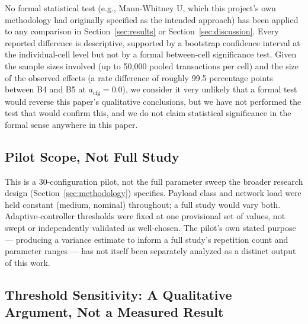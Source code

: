 \documentclass[journal]{IEEEtran}
\newcommand{\acfg}{\ensuremath{a_{\text{cfg}}}}
\begin{document}
No formal statistical test (e.g., Mann-Whitney U, which this project's own methodology had originally specified as the intended approach) has been applied to any comparison in Section~\ref{sec:results} or Section~\ref{sec:discussion}. Every reported difference is descriptive, supported by a bootstrap confidence interval at the individual-cell level but not by a formal between-cell significance test. Given the sample sizes involved (up to 50{,}000 pooled transactions per cell) and the size of the observed effects (a rate difference of roughly 99.5 percentage points between B4 and B5 at $\acfg=0.0$), we consider it very unlikely that a formal test would reverse this paper's qualitative conclusions, but we have not performed the test that would confirm this, and we do not claim statistical significance in the formal sense anywhere in this paper.

\subsection{Pilot Scope, Not Full Study}

This is a 30-configuration pilot, not the full parameter sweep the broader research design (Section~\ref{sec:methodology}) specifies. Payload class and network load were held constant (medium, nominal) throughout; a full study would vary both. Adaptive-controller thresholds were fixed at one provisional set of values, not swept or independently validated as well-chosen. The pilot's own stated purpose --- producing a variance estimate to inform a full study's repetition count and parameter ranges --- has not itself been separately analyzed as a distinct output of this work.

\subsection{Threshold Sensitivity: A Qualitative Argument, Not a Measured Result}
\end{document}
